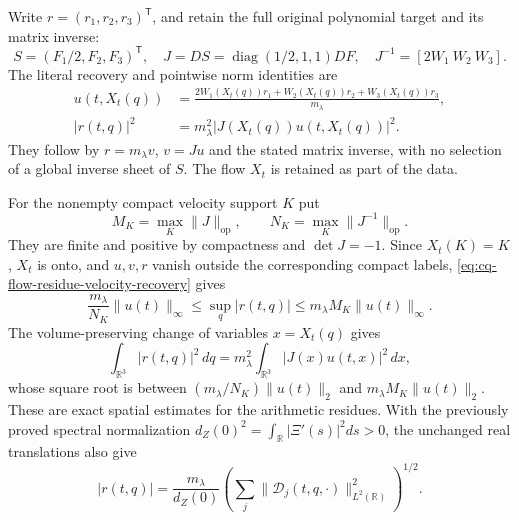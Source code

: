 Write $r=(r_1,r_2,r_3)^{\mathsf T}$, and retain the full original
polynomial target and its matrix inverse:
\[
 S=(F_1/2,F_2,F_3)^{\mathsf T},\quad
 J=DS=\operatorname{diag}(1/2,1,1)DF,\quad
 J^{-1}=[2W_1\ W_2\ W_3].
\]
The literal recovery and pointwise norm identities are
\begin{equation}
 \begin{aligned}
 u(t,X_t(q))
 &=\frac{2W_1(X_t(q))r_1+
              W_2(X_t(q))r_2+W_3(X_t(q))r_3}{m_\lambda},\\
 |r(t,q)|^2&=m_\lambda^2|J(X_t(q))u(t,X_t(q))|^2 .
 \end{aligned}
 \label{eq:cq-flow-residue-velocity-recovery}
\end{equation}
They follow by $r=m_\lambda v$, $v=Ju$ and the stated matrix
inverse, with no selection of a global inverse sheet of $S$.
The flow $X_t$ is retained as part of the data.

For the nonempty compact velocity support $K$ put
\[
 M_K=\max_K\|J\|_{\mathrm{op}},\qquad
 N_K=\max_K\|J^{-1}\|_{\mathrm{op}}.
\]
They are finite and positive by compactness and $\det J=-1$.
Since $X_t(K)=K$, $X_t$ is onto, and $u,v,r$ vanish outside
the corresponding compact labels, \eqref{eq:cq-flow-residue-velocity-recovery}
gives
\begin{equation}
 \frac{m_\lambda}{N_K}\|u(t)\|_\infty
 \leq\sup_q|r(t,q)|
 \leq m_\lambda M_K\|u(t)\|_\infty .
 \label{eq:cq-flow-residue-supremum}
\end{equation}
The volume-preserving change of variables $x=X_t(q)$ gives
\begin{equation}
 \int_{\mathbb R^3}|r(t,q)|^2\,dq
 =m_\lambda^2\int_{\mathbb R^3}|J(x)u(t,x)|^2\,dx,
 \label{eq:cq-flow-residue-energy}
\end{equation}
whose square root is between
$(m_\lambda/N_K)\|u(t)\|_2$ and
$m_\lambda M_K\|u(t)\|_2$.
These are exact spatial estimates for the arithmetic residues.
With the previously proved spectral normalization
$d_Z(0)^2=\int_{\mathbb R}|\Xi'(s)|^2ds>0$, the unchanged
real translations also give
\[
 |r(t,q)|
 =\frac{m_\lambda}{d_Z(0)}
       \left(\sum_j\|\mathcal D_j(t,q,\cdot)\|_{L^2(\mathbb R)}^2
       \right)^{1/2}.
\]

